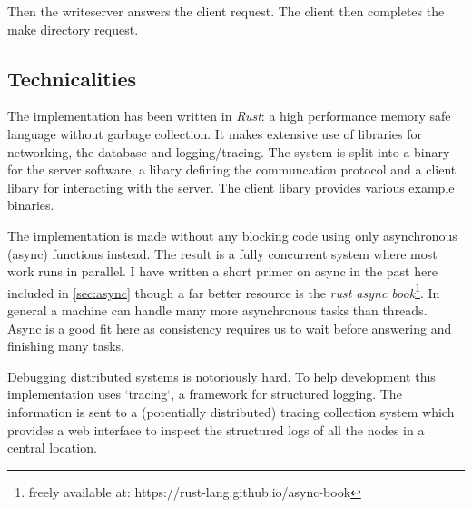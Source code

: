 Then the writeserver answers the client request. The client then completes the make directory request.

\subsection{Technicalities}
The implementation has been written in \textit{Rust}: a high performance memory safe language without garbage collection. It makes extensive use of libraries for networking, the database and logging/tracing. The system is split into a binary for the server software, a libary defining the communcation protocol and a client libary for interacting with the server. The client libary provides various example binaries.

The implementation is made without any blocking code using only asynchronous (async) functions instead. The result is a fully concurrent system where most work runs in parallel. I have written a short primer on async in the past here included in \cref{sec:async} though a far better resource is the \textit{rust async book}\footnote{freely available at: https://rust-lang.github.io/async-book}. In general a machine can handle many more asynchronous tasks than threads. Async is a good fit here as consistency requires us to wait before answering and finishing many tasks.

Debugging distributed systems is notoriously hard. To help development this implementation uses `tracing`, a framework for structured logging. The information is sent to a (potentially distributed) tracing collection system which provides a web interface to inspect the structured logs of all the nodes in a central location.
